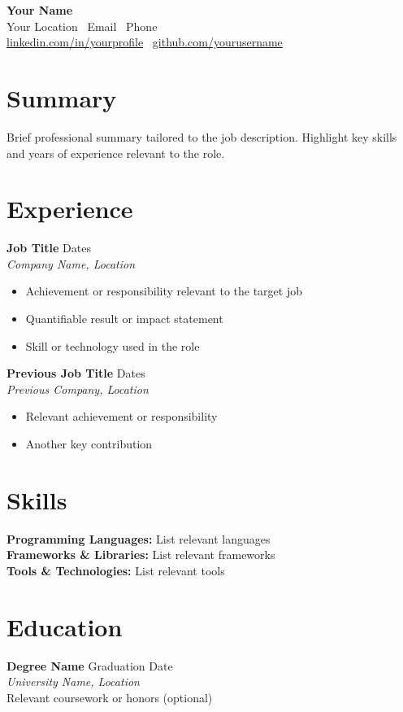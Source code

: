 \documentclass[11pt,a4paper]{article}
\begin{document}
\begin{center}
    {\Huge \textbf{Your Name}}\\
    \vspace{4pt}
    Your Location \textbullet\ Email \textbullet\ Phone\\
    \href{https://linkedin.com/in/yourprofile}{linkedin.com/in/yourprofile} \textbullet\ \href{https://github.com/yourusername}{github.com/yourusername}
\end{center}

\vspace{-8pt}

\section*{Summary}
Brief professional summary tailored to the job description. Highlight key skills and years of experience relevant to the role.

\section*{Experience}
\textbf{Job Title} \hfill Dates\\
\textit{Company Name, Location}
\begin{itemize}
    \item Achievement or responsibility relevant to the target job
    \item Quantifiable result or impact statement
    \item Skill or technology used in the role
\end{itemize}

\textbf{Previous Job Title} \hfill Dates\\
\textit{Previous Company, Location}
\begin{itemize}
    \item Relevant achievement or responsibility
    \item Another key contribution
\end{itemize}

\section*{Skills}
\textbf{Programming Languages:} List relevant languages\\
\textbf{Frameworks \& Libraries:} List relevant frameworks\\
\textbf{Tools \& Technologies:} List relevant tools

\section*{Education}
\textbf{Degree Name} \hfill Graduation Date\\
\textit{University Name, Location}\\
Relevant coursework or honors (optional)
\end{document}
